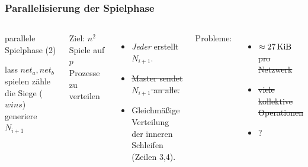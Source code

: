 \begin{frame}
    \frametitle{Parallelisierung der Spielphase}

    \begin{columns}[t]
        \vspace{-0.7cm}
        \begin{algorithm}[H]
            \caption{parallele Spielphase (2)}
            \begin{algorithmic}[1]
                            \State lass $net_a, net_b$ spielen
                            \State zähle die Siege ($wins$)
                        \EndParDo
                    \EndParDo
                    \State {}
                    \State generiere $N_{i+1}$
                \EndFor
            \end{algorithmic}
        \end{algorithm}
        \hfill

        Ziel: $n^2$ Spiele auf $p$ Prozesse zu verteilen
        \begin{itemize}
            \item \emph{Jeder} erstellt $N_{i+1}$.
            \item \sout{Master sendet $N_{i+1}$ an alle.}
            \item Gleichmäßige Verteilung der inneren Schleifen (Zeilen 3,4).
        \end{itemize}
        Probleme:
        \begin{itemize}
            \item \sout{$\approx \SI{27}{\kibi\byte}$ pro Netzwerk}
            \item \sout{viele kollektive Operationen}
            \item ?
        \end{itemize}
    \end{columns}
\end{frame}

